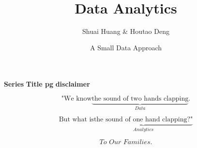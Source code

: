 \documentclass[]{tufte-book}
\title{Data Analytics}
\author{Shuai Huang \& Houtao Deng}
\date{A Small Data Approach}
\newcommand\blankpage{%
    \null
    \thispagestyle{empty}%
    \newpage}
\begin{document}
\maketitle




\newpage
\thispagestyle{empty}
\textbf{Series}
\newpage
\thispagestyle{empty}
\textbf{Title pg}
\newpage
\thispagestyle{empty}
\textbf{disclaimer}

\newpage
\thispagestyle{empty}
\afterpage{\blankpage}

\hspace{0pt}
\vfill

\begin{equation*}
\text{"We know} \underbrace{\text{the sound of two hands clapping}}_{Data}. 
\end{equation*}

\begin{equation*}
\text{But what is} \underbrace{\text{the sound of one hand clapping?"}}_{ Analytics}
\end{equation*}

\vfill
\hspace{0pt}



\newpage
\thispagestyle{empty}
\afterpage{\blankpage}


\hspace{0pt}
\vfill
\begin{equation*}
\textit{To Our Families}. 
\end{equation*}
\vfill
\hspace{0pt}


{
\setcounter{tocdepth}{1}
\tableofcontents
}








\printindex
\end{document}

